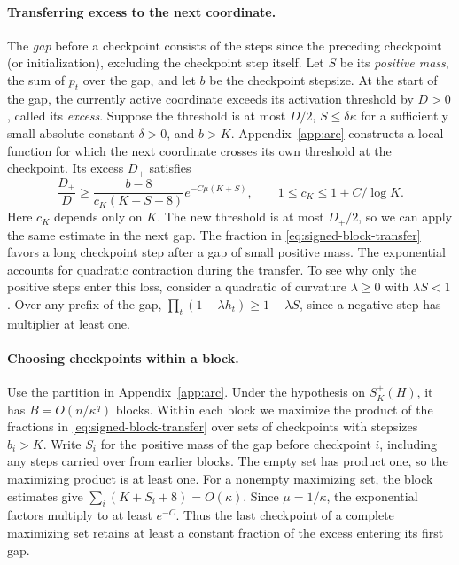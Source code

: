 \documentclass[11pt]{article}
\theoremstyle{definition}
\begin{document}
\paragraph{Transferring excess to the next coordinate.}
The \emph{gap} before a checkpoint consists of the steps since the preceding
checkpoint (or initialization), excluding the checkpoint step itself.
Let \(S\) be its \emph{positive mass}, the sum of \(p_t\) over the gap,
and let \(b\) be the checkpoint stepsize. At the start of the gap, the
currently active coordinate exceeds its activation threshold by \(D>0\),
called its \emph{excess}. Suppose the threshold is at most \(D/2\),
\(S\le\delta\kappa\) for a sufficiently small absolute constant \(\delta>0\),
and \(b>K\). Appendix~\ref{app:arc} constructs a local function for which
the next coordinate crosses its own threshold at the checkpoint. Its
excess \(D_+\) satisfies
\begin{equation}\label{eq:signed-block-transfer}
 \frac{D_+}{D}\ge\frac{b-8}{c_K(K+S+8)}e^{-C\mu(K+S)},
 \qquad 1\le c_K\le1+C/\log K .
\end{equation}
Here \(c_K\) depends only on \(K\). The new threshold is at most \(D_+/2\),
so we can apply the same estimate in the next gap. The fraction in
\eqref{eq:signed-block-transfer} favors a long checkpoint step after a
gap of small positive mass. The exponential accounts for quadratic
contraction during the transfer. To see why only the positive steps enter
this loss, consider a quadratic of curvature \(\lambda\ge0\) with
\(\lambda S<1\). Over any prefix of the gap,
\(\prod_t(1-\lambda h_t)\ge1-\lambda S\), since a negative step has
multiplier at least one.

\paragraph{Choosing checkpoints within a block.}
Use the partition in Appendix~\ref{app:arc}. Under the hypothesis on
\(S_K^+(H)\), it has \(B=O(n/\kappa^q)\) blocks. Within each block we
maximize the product of the fractions in \eqref{eq:signed-block-transfer}
over sets of checkpoints with stepsizes \(b_i>K\). Write \(S_i\) for
the positive mass of the gap before checkpoint \(i\), including any steps
carried over from earlier blocks. The empty set has product one, so the
maximizing product is at least one. For a nonempty maximizing set, the
block estimates give \(\sum_i(K+S_i+8)=O(\kappa)\). Since \(\mu=1/\kappa\),
the exponential factors multiply to at least \(e^{-C}\).
Thus the last checkpoint of a complete maximizing set retains at least
a constant fraction of the excess entering its first gap.
\end{document}
